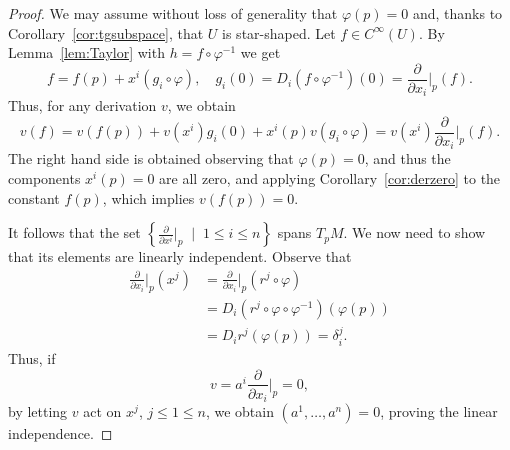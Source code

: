 \begin{proof}
  We may assume without loss of generality that $\varphi(p) = 0$ and, thanks to Corollary~\ref{cor:tgsubspace}, that $U$ is star-shaped.
  Let $f\in C^\infty(U)$.
  By Lemma~\ref{lem:Taylor} with $h = f \circ \varphi^{-1}$ we get
  \begin{equation}
    f = f(p) + x^i (g_i \circ \varphi),
    \quad g_i(0) = D_i (f \circ \varphi^{-1})(0) = \frac{\partial}{\partial x_i}\Big|_p(f).
  \end{equation}
  Thus, for any derivation $v$, we obtain
  \begin{equation}
    v(f) = v(f(p)) + v(x^i)g_i(0) + x^i(p) v(g_i\circ\varphi) = v(x^i)  \frac{\partial}{\partial x_i}\Big|_p(f).
  \end{equation}
  The right hand side is obtained observing that $\varphi(p) = 0$, and thus the components $x^i(p) = 0$ are all zero, and applying Corollary~\ref{cor:derzero} to the constant $f(p)$, which implies $v(f(p)) = 0$.

  It follows that the set $\left\{\frac{\partial}{\partial x^i}\Big|_p\;\mid\; 1\leq i\leq n\right\}$ spans $T_p M$.
  We now need to show that its elements are linearly independent.
  Observe that
  \begin{align}
    \frac{\partial}{\partial x_i}\Big|_p (x^j) & =
    \frac{\partial}{\partial x_i}\Big|_p (r^j \circ \varphi)                                               \\
                                               & = D_i (r^j \circ \varphi \circ \varphi^{-1}) (\varphi(p)) \\
                                               & = D_i r^j(\varphi(p)) = \delta^j_i.
  \end{align}
  Thus, if
  \begin{equation}
    v = a^i \frac{\partial}{\partial x_i}\Big|_p = 0,
  \end{equation}
  by letting $v$ act on $x^j$, $j\leq 1\leq n$, we obtain $(a^1, \ldots, a^n) = 0$, proving the linear independence.
\end{proof}

